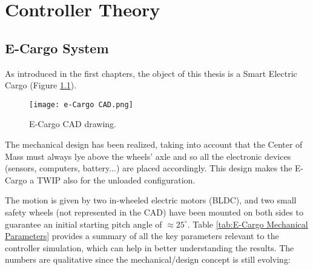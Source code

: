 \chapter{Controller Theory}
\label{ch:chapter_four}%

\section{E-Cargo System}
\label{sec:E-Cargo}

As introduced in the first chapters, the object of this thesis is a Smart Electric Cargo (Figure \ref{fig:E-Cargo CAD drawing}).


\begin{figure}
    \centering
    \texttt{[image: e-Cargo CAD.png]}
    \caption{E-Cargo CAD drawing.}
    \label{fig:E-Cargo CAD drawing}
\end{figure}

The mechanical design has been realized, taking into account that the Center of Mass must always lye above the wheels' axle and so all the electronic devices (sensors, computers, battery...) are placed accordingly.
This design makes the E-Cargo a TWIP also for the unloaded configuration.

The motion is given by two in-wheeled electric motors (BLDC), and two small safety wheels (not represented in the CAD) have been mounted on both sides to guarantee an initial starting pitch angle of $\approx 25^{\circ}$.
Table \ref{tab:E-Cargo Mechanical Parameters} provides a summary of all the key parameters relevant to the controller simulation, which can help in better understanding the results.
The numbers are qualitative since the mechanical/design concept is still evolving:

